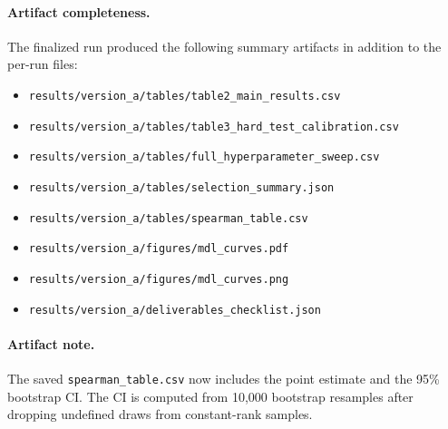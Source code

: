\documentclass[preprint]{article}
\begin{document}
\paragraph{Artifact completeness.}
The finalized run produced the following summary artifacts in addition to the per-run files:

\begin{itemize}
    \item \texttt{results/version\_a/tables/table2\_main\_results.csv}
    \item \texttt{results/version\_a/tables/table3\_hard\_test\_calibration.csv}
    \item \texttt{results/version\_a/tables/full\_hyperparameter\_sweep.csv}
    \item \texttt{results/version\_a/tables/selection\_summary.json}
    \item \texttt{results/version\_a/tables/spearman\_table.csv}
    \item \texttt{results/version\_a/figures/mdl\_curves.pdf}
    \item \texttt{results/version\_a/figures/mdl\_curves.png}
    \item \texttt{results/version\_a/deliverables\_checklist.json}
\end{itemize}

\paragraph{Artifact note.}
The saved \texttt{spearman\_table.csv} now includes the point estimate and the 95\% bootstrap CI.
The CI is computed from 10{,}000 bootstrap resamples after dropping undefined draws from constant-rank samples.
\end{document}
